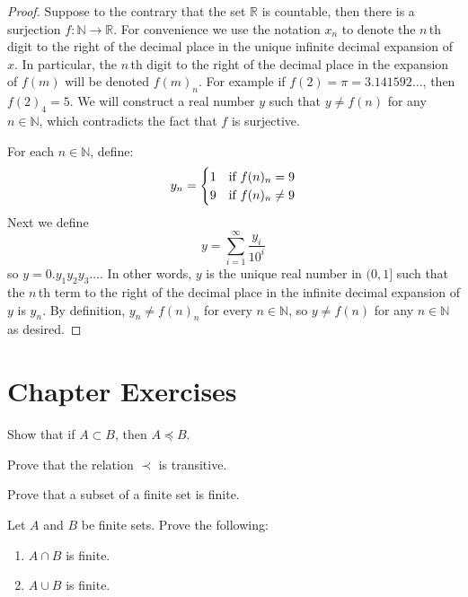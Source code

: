 \begin{proof}
Suppose to the contrary that the set $\mathbb R$ is countable, then there is a surjection $f:\mathbb N\to\mathbb R$.  For convenience we use the notation $x_n$ to denote the $n\,$th digit to the right of the decimal place in the unique infinite decimal expansion of $x$.  In particular, the $n\,$th digit to the right of the decimal place in the expansion of $f(m)$ will be denoted $f(m)_n$. For example if $f(2)=\pi=3.141592\ldots$, then $f(2)_4=5$.  We will construct a real number $y$ such that $y\neq f(n)$ for any $n\in\mathbb N$, which contradicts the fact that $f$ is surjective.

For each $n\in\mathbb N$, define: \[ y_n =\begin{cases} 1 & \mbox{if } f(n)_n=9\cr 9 & \mbox{if } f(n)_n\neq9\cr\end{cases} \] Next we define \[ y=\sum_{i=1}^\infty \frac{y_i}{10^i}\] so $y=0.y_1y_2y_3\ldots$.  In other words, $y$ is the unique real number in $(0,1]$ such that the $n\,$th term to the right of the decimal place in the infinite decimal expansion of $y$ is $y_n$.  By definition, $y_n\neq f(n)_n$ for every $n \in \mathbb N$, so $y\neq f(n)$ for any $n\in \mathbb N$ as desired.
\end{proof}

\clearpage

\section*{Chapter  Exercises}
\anschapter

\begin{exercise}\label{ex:monotone}
Show that if $A\subset B$, then $A\preceq B$.
\end{exercise}

\begin{exercise}\label{exer:CBtran}
Prove that the relation $\prec$ is transitive. 
\end{exercise}

\begin{exercise}\label{ex:subfinite}
Prove that a subset of a finite set is finite.
\end{exercise}

\begin{exercise}\label{ex:finunions}
Let $A$ and $B$ be finite sets.  Prove the following:
\begin{enumerate}
\item $A\cap B$ is finite.
\item $A\cup B$ is finite.
\end{enumerate}
\end{exercise}

